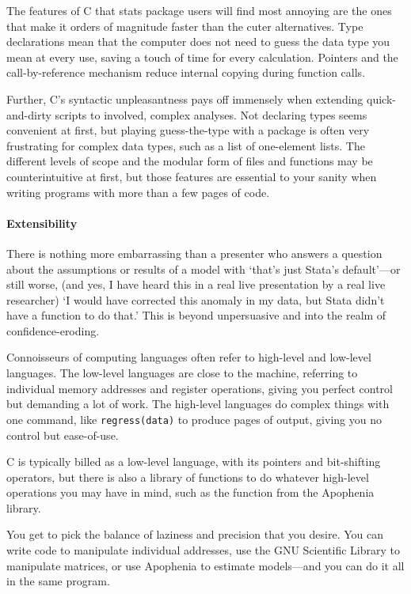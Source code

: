 The features of C that stats package users will find most annoying are
the ones that make it orders of magnitude faster than the cuter
alternatives.  Type declarations mean that the computer does not need
to guess the data type you mean at every use, saving a touch of time for
every calculation.  Pointers and the call-by-reference mechanism reduce
internal copying during function calls.

Further, C's syntactic unpleasantness pays off immensely when extending
quick-and-dirty scripts to involved, complex analyses.
Not declaring types seems convenient at first, but playing guess-the-type
with a package is often very frustrating for complex data types, such
as a list of one-element lists. The different levels of scope and the
modular form of files and functions may be counterintuitive at first,
but those features are essential to your sanity when
writing programs with more than a few pages of code.

\paragraph{Extensibility}
There is nothing more embarrassing than a presenter who answers a question
about the assumptions or results of a model with `that's just Stata's
default'---or still worse, (and yes, I have heard this in a real live
presentation by a real live researcher) `I would have corrected this
anomaly in my data, but Stata didn't have a function to do that.' This
is beyond unpersuasive and into the realm of confidence-eroding.

Connoisseurs of computing languages often refer to high-level and
low-level languages. The low-level languages are close to the machine,
referring to individual memory addresses and register operations,
giving you perfect control but demanding a lot of work. The high-level
languages do complex things with one command, like {\tt regress(data)}
to produce pages of output, giving you no control but ease-of-use.

C is typically billed as a low-level language, with its pointers and
bit-shifting operators, but there is also a library of functions to
do whatever high-level operations you may have in mind, such as the
 function from the Apophenia library.

You get to pick the balance of laziness and precision that you desire. You
can write code to manipulate individual addresses, use the GNU Scientific
Library to manipulate matrices, or use Apophenia to estimate models---and
you can do it all in the same program.

